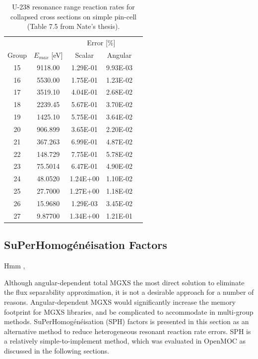 \begin{table}[h!]
  \centering
  \caption{U-238 resonance range reaction rates for collapsed cross sections on simple pin-cell {(\color{red}Table 7.5 from Nate's thesis)}.}
  \label{tab:case1-bias} 
  \begin{tabular}{c c c c c}
  \toprule
  & & \multicolumn{2}{c}{Error [\%]} \\
  \cline{3-4}
  Group & $E_{max}$ [eV] & Scalar & Angular \\
  \midrule
  15 & 9118.00 & 1.29E-01 & 9.93E-03 \\
  16 & 5530.00 & 1.75E-01 & 1.23E-02 \\
  17 & 3519.10 & 4.04E-01 & 2.68E-02 \\
  18 & 2239.45 & 5.67E-01 & 3.70E-02 \\
  19 & 1425.10 & 5.75E-01 & 3.64E-02 \\
  20 & 906.899 & 3.65E-01 & 2.20E-02 \\
  21 & 367.263 & 6.99E-01 & 4.87E-02 \\
  22 & 148.729 & 7.75E-01 & 5.78E-02 \\
  23 & 75.5014 & 6.47E-01 & 4.90E-02 \\
  24 & 48.0520 & 1.24E+00 & 1.10E-02 \\
  25 & 27.7000 & 1.27E+00 & 1.18E-02 \\
  26 & 15.9680 & 1.29E-03 & 3.45E-02 \\
  27 & 9.87700 & 1.34E+00 & 1.21E-01 \\
  \bottomrule
\end{tabular}
\end{table}


\subsection{SuPerHomog\'{e}n\'{e}isation Factors}
\label{subsec:sph}

Hmm \cite{hebert2005ribon}, \cite{hebert1993consistent} \cite{hebert1997advances}

Although angular-dependent total MGXS the most direct solution to eliminate the flux separability approximation, it is not a desirable approach for a number of reasons. Angular-dependent MGXS would significantly increase the memory footprint for MGXS libraries, and be complicated to accommodate in multi-group methods. SuPerHomog\'{e}n\'{e}isation (SPH) factors is presented in this section as an alternative method to reduce heterogeneous resonant reaction rate errors. SPH is a relatively simple-to-implement method, which was evaluated in OpenMOC as discussed in the following sections.


